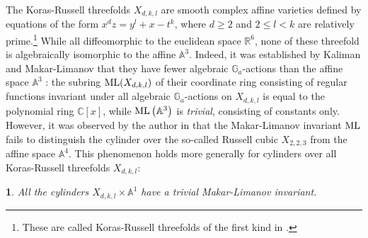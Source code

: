 \documentclass[10pt,oneside,english]{amsart}
\numberwithin{equation}{section}
\numberwithin{figure}{section}
\theoremstyle{plain}
\theoremstyle{remark}
\theoremstyle{plain}
\newtheorem{cor}[thm]{\protect\corollaryname}
\theoremstyle{plain}
\theoremstyle{definition}
\providecommand{\corollaryname}{Corollary}
\begin{document}
\indent The Koras-Russell threefolds $X_{d,k,l}$ are smooth complex
affine varieties defined by equations of the form $x^{d}z=y^{l}+x-t^{k}$,
where $d\geq2$ and $2\leq l<k$ are relatively prime.\footnote{These are called Koras-Russell threefolds of the first kind in \cite{Moser-Jauslin2010}.} While all diffeomorphic to the euclidean space $\mathbb{R}^{6}$,
none of these threefold is algebraically isomorphic to the affine
$\mathbb{A}^{3}$. Indeed, it was established by Kaliman and Makar-Limanov
\cite{Makar-Limanov1996,Kaliman1997} that they have fewer algebraic
$\mathbb{G}_{a}$-actions than the affine space $\mathbb{A}^{3}$
: the subring ${\rm ML}(X_{d,k,l})$ of their coordinate ring consisting
of regular functions invariant under all algebraic $\mathbb{G}_{a}$-actions
on $X_{d,k,l}$ is equal to the polynomial ring $\mathbb{C}\left[x\right]$,
while ${\rm ML}\left(\mathbb{A}^{3}\right)$ is \emph{trivial}, consisting
of constants only. However, it was observed by the author in \cite{DuboulozTG2009}
that the Makar-Limanov invariant ${\rm ML}$ fails to distinguish
the cylinder over the so-called Russell cubic $X_{2,2,3}$ from the
affine space $\mathbb{A}^{4}$. This phenomenon holds more generally
for cylinders over all Koras-Russell threefolds $X_{d,k,l}$: 
\begin{cor}
\label{cor:KR-threefolds} All the cylinders $X_{d,k,l}\times\mathbb{A}^{1}$
have a trivial Makar-Limanov invariant. \end{cor}
\end{document}
